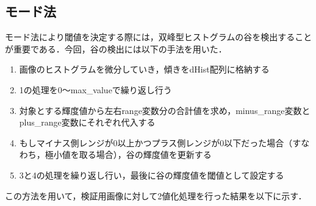 \documentclass{jsarticle}
\begin{document}
\subsection{モード法}
モード法により閾値を決定する際には，双峰型ヒストグラムの谷を検出することが重要である．今回，谷の検出には以下の手法を用いた．
\begin{enumerate}
  \item 画像のヒストグラムを微分していき，傾きをdHist配列に格納する
  \item 1の処理を0〜max\_valueで繰り返し行う
  \item 対象とする輝度値から左右range変数分の合計値を求め，minus\_range変数とplus\_range変数にそれぞれ代入する
  \item もしマイナス側レンジが0以上かつプラス側レンジが0以下だった場合（すなわち，極小値を取る場合），谷の輝度値を更新する
  \item 3と4の処理を繰り返し行い，最後に谷の輝度値を閾値として設定する
\end{enumerate}
この方法を用いて，検証用画像に対して2値化処理を行った結果を以下に示す．
\end{document}
